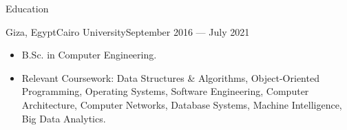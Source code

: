 \documentclass[]{mcdowellcv}
\begin{document}
	\makeheader
	
	
	\begin{cvsection}{Education}
		\begin{cvsubsection}{Giza, Egypt}{Cairo University}{September 2016 — July 2021}
			\begin{itemize}
				\item B.Sc. in Computer Engineering.
				\item Relevant Coursework: Data Structures \& Algorithms, Object-Oriented Programming, Operating Systems, Software Engineering, Computer Architecture, Computer Networks, Database Systems, Machine Intelligence, Big Data Analytics.
			\end{itemize}
		\end{cvsubsection}
	\end{cvsection}
	
\end{document}
